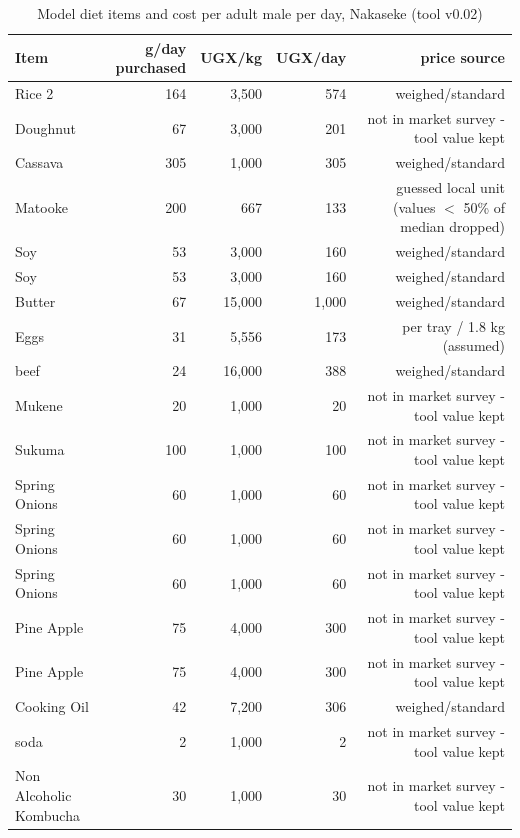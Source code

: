 \begin{table}[htbp]
\centering
\caption{Model diet items and cost per adult male per day, Nakaseke (tool v0.02)}
\label{tab:model_diet_items_nakaseke}
\begin{tabular}{lrrrr}
\toprule
Item & g/day purchased & UGX/kg & UGX/day & price source \\
\midrule
Rice 2 & 164 & 3,500 & 574 & weighed/standard \\
Doughnut & 67 & 3,000 & 201 & not in market survey - tool value kept \\
Cassava & 305 & 1,000 & 305 & weighed/standard \\
Matooke & 200 & 667 & 133 & guessed local unit (values $<$ 50\% of median dropped) \\
Soy & 53 & 3,000 & 160 & weighed/standard \\
Soy & 53 & 3,000 & 160 & weighed/standard \\
Butter & 67 & 15,000 & 1,000 & weighed/standard \\
Eggs & 31 & 5,556 & 173 & per tray / 1.8 kg (assumed) \\
beef & 24 & 16,000 & 388 & weighed/standard \\
Mukene & 20 & 1,000 & 20 & not in market survey - tool value kept \\
Sukuma & 100 & 1,000 & 100 & not in market survey - tool value kept \\
Spring Onions & 60 & 1,000 & 60 & not in market survey - tool value kept \\
Spring Onions & 60 & 1,000 & 60 & not in market survey - tool value kept \\
Spring Onions & 60 & 1,000 & 60 & not in market survey - tool value kept \\
Pine Apple & 75 & 4,000 & 300 & not in market survey - tool value kept \\
Pine Apple & 75 & 4,000 & 300 & not in market survey - tool value kept \\
Cooking Oil & 42 & 7,200 & 306 & weighed/standard \\
soda & 2 & 1,000 & 2 & not in market survey - tool value kept \\
Non Alcoholic Kombucha & 30 & 1,000 & 30 & not in market survey - tool value kept \\
\bottomrule
\end{tabular}
\end{table}
